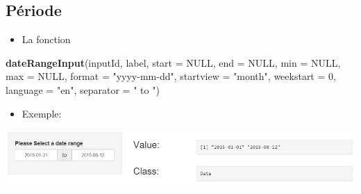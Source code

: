 \documentclass[
]{article}
\newenvironment{Shaded}{\begin{snugshade}}{\end{snugshade}}
\newcommand{\AttributeTok}[1]{\textcolor[rgb]{0.13,0.29,0.53}{#1}}
\newcommand{\CommentTok}[1]{\textcolor[rgb]{0.56,0.35,0.01}{\textit{#1}}}
\newcommand{\ConstantTok}[1]{\textcolor[rgb]{0.56,0.35,0.01}{#1}}
\newcommand{\DecValTok}[1]{\textcolor[rgb]{0.00,0.00,0.81}{#1}}
\newcommand{\FunctionTok}[1]{\textcolor[rgb]{0.13,0.29,0.53}{\textbf{#1}}}
\newcommand{\NormalTok}[1]{#1}
\newcommand{\StringTok}[1]{\textcolor[rgb]{0.31,0.60,0.02}{#1}}
\providecommand{\tightlist}{%
  \setlength{\itemsep}{0pt}\setlength{\parskip}{0pt}}
\begin{document}
\hypertarget{puxe9riode}{%
\subsection{Période}\label{puxe9riode}}

\begin{itemize}
\tightlist
\item
  La fonction
\end{itemize}

\begin{Shaded}
\begin{Highlighting}[]
\FunctionTok{dateRangeInput}\NormalTok{(inputId, label, }\AttributeTok{start =} \ConstantTok{NULL}\NormalTok{, }\AttributeTok{end =} \ConstantTok{NULL}\NormalTok{, }\AttributeTok{min =} \ConstantTok{NULL}\NormalTok{, }\AttributeTok{max =} \ConstantTok{NULL}\NormalTok{,}
               \AttributeTok{format =} \StringTok{"yyyy{-}mm{-}dd"}\NormalTok{, }\AttributeTok{startview =} \StringTok{"month"}\NormalTok{, }\AttributeTok{weekstart =} \DecValTok{0}\NormalTok{,}
               \AttributeTok{language =} \StringTok{"en"}\NormalTok{, }\AttributeTok{separator =} \StringTok{" to "}\NormalTok{)}
\end{Highlighting}
\end{Shaded}

\begin{itemize}
\tightlist
\item
  Exemple:
\end{itemize}

\begin{Shaded}
\end{Shaded}

\includegraphics{img/date_range.png}
\end{document}
